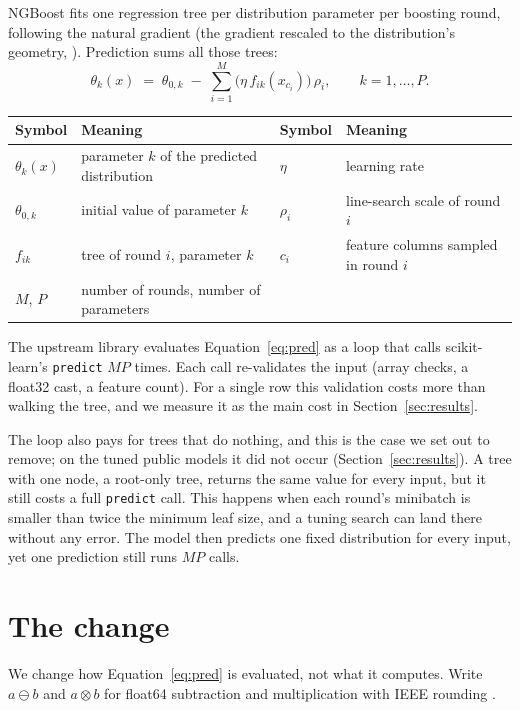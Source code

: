 \documentclass{article}
\newcommand{\fsub}{\ominus}
\newcommand{\fmul}{\otimes}
\begin{document}
NGBoost \citep{duan2020ngboost} fits one regression tree per distribution parameter per boosting round, following the natural gradient (the gradient rescaled to the distribution's geometry, \citealp{amari1998natural}).
Prediction sums all those trees:
\begin{equation}
\theta_k(x) \;=\; \theta_{0,k} \;-\; \sum_{i=1}^{M} \big(\eta\, f_{ik}(x_{c_i})\big)\,\rho_i, \qquad k = 1,\dots,P.
\label{eq:pred}
\end{equation}
\begin{center}\footnotesize
\begin{tabular}{@{}ll@{\qquad}ll@{}}
\toprule
Symbol & Meaning & Symbol & Meaning\\
\midrule
$\theta_k(x)$ & parameter $k$ of the predicted distribution & $\eta$ & learning rate\\
$\theta_{0,k}$ & initial value of parameter $k$ & $\rho_i$ & line-search scale of round $i$\\
$f_{ik}$ & tree of round $i$, parameter $k$ & $c_i$ & feature columns sampled in round $i$\\
$M$, $P$ & number of rounds, number of parameters & & \\
\bottomrule
\end{tabular}
\end{center}
The upstream library \citep{ngboost_software} evaluates Equation~\eqref{eq:pred} as a loop that calls scikit-learn's \texttt{predict} \citep{pedregosa2011sklearn} $M P$ times.
Each call re-validates the input (array checks, a float32 cast, a feature count).
For a single row this validation costs more than walking the tree, and we measure it as the main cost in Section~\ref{sec:results}.

The loop also pays for trees that do nothing, and this is the case we set out to remove; on the tuned public models it did not occur (Section~\ref{sec:results}).
A tree with one node, a root-only tree, returns the same value for every input, but it still costs a full \texttt{predict} call.
This happens when each round's minibatch is smaller than twice the minimum leaf size, and a tuning search can land there without any error.
The model then predicts one fixed distribution for every input, yet one prediction still runs $M P$ calls.

\section{The change}
\label{sec:change}

We change how Equation~\eqref{eq:pred} is evaluated, not what it computes. Write $a \fsub b$ and $a \fmul b$ for float64 subtraction and multiplication with IEEE rounding \citep{goldberg1991floating}.
\end{document}
